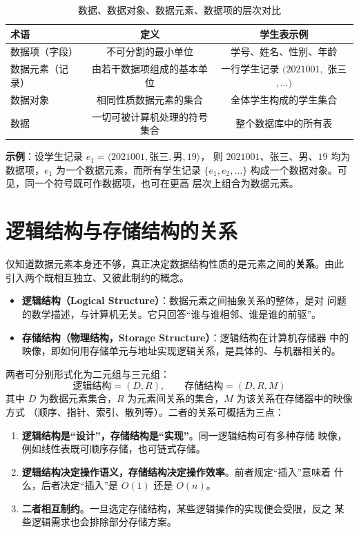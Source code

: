 \begin{table}[htbp]
\centering
\renewcommand{\arraystretch}{1.4}
\begin{tabulary}{\textwidth}{@{}LCC@{}} 
\toprule
\textbf{术语} & \textbf{定义} & \textbf{学生表示例} \\
\midrule
数据项（字段） & 不可分割的最小单位 & 学号、姓名、性别、年龄 \\
数据元素（记录） & 由若干数据项组成的基本单位 & 一行学生记录 $(2021001,$ 张三$,\dots)$ \\
数据对象 & 相同性质数据元素的集合 & 全体学生构成的学生集合 \\
数据 & 一切可被计算机处理的符号集合 & 整个数据库中的所有表 \\
\bottomrule
\end{tabulary}
\caption{数据、数据对象、数据元素、数据项的层次对比}
\label{tab:terms}
\end{table}

\textbf{示例}：设学生记录 $e_1 = \langle 2021001, \text{张三}, \text{男}, 19 \rangle$，
则 $2021001$、张三、男、$19$ 均为数据项，$e_1$ 为一个数据元素，而所有学生记录
$\{e_1, e_2, \dots\}$ 构成一个数据对象。可见，同一个符号既可作数据项，也可在更高
层次上组合为数据元素。

\section{逻辑结构与存储结构的关系}

仅知道数据元素本身还不够，真正决定数据结构性质的是元素之间的\textbf{关系}。由此
引入两个既相互独立、又彼此制约的概念。

\begin{itemize}
    \item \textbf{逻辑结构（Logical Structure）}：数据元素之间抽象关系的整体，是对
          问题的数学描述，与计算机无关。它只回答“谁与谁相邻、谁是谁的前驱”。
    \item \textbf{存储结构（物理结构，Storage Structure）}：逻辑结构在计算机存储器
          中的映像，即如何用存储单元与地址实现逻辑关系，是具体的、与机器相关的。
\end{itemize}

两者可分别形式化为二元组与三元组：
$$\text{逻辑结构} = (D, R), \qquad \text{存储结构} = (D, R, M)$$
其中 $D$ 为数据元素集合，$R$ 为元素间关系的集合，$M$ 为该关系在存储器中的映像方式
（顺序、指针、索引、散列等）。二者的关系可概括为三点：

\begin{enumerate}
    \item \textbf{逻辑结构是“设计”，存储结构是“实现”}。同一逻辑结构可有多种存储
          映像，例如线性表既可顺序存储，也可链式存储。
    \item \textbf{逻辑结构决定操作语义，存储结构决定操作效率}。前者规定“插入”意味着
          什么，后者决定“插入”是 $O(1)$ 还是 $O(n)$。
    \item \textbf{二者相互制约}。一旦选定存储结构，某些逻辑操作的实现便会受限，反之
          某些逻辑需求也会排除部分存储方案。
\end{enumerate}

